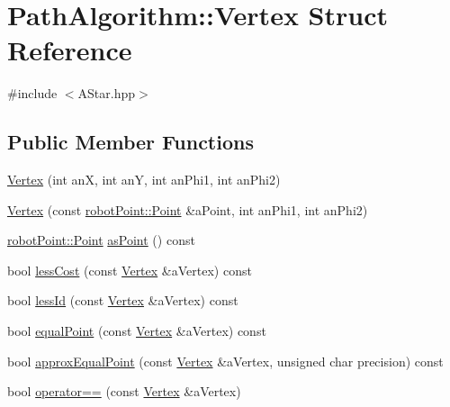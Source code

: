 \hypertarget{struct_path_algorithm_1_1_vertex}{}\section{Path\+Algorithm\+:\+:Vertex Struct Reference}
\label{struct_path_algorithm_1_1_vertex}


{\ttfamily \#include $<$A\+Star.\+hpp$>$}

\subsection*{Public Member Functions}
\begin{DoxyCompactItemize}
\item 
\hyperlink{struct_path_algorithm_1_1_vertex_af70ec098c542a181f2267be2db00b6c4}{Vertex} (int anX, int anY, int an\+Phi1, int an\+Phi2)
\item 
\hyperlink{struct_path_algorithm_1_1_vertex_ae480a024481aa5a9930822e69dd9a11d}{Vertex} (const \hyperlink{structrobot_point_1_1_point}{robot\+Point\+::\+Point} \&a\+Point, int an\+Phi1, int an\+Phi2)
\item 
\hyperlink{structrobot_point_1_1_point}{robot\+Point\+::\+Point} \hyperlink{struct_path_algorithm_1_1_vertex_a587c9c56b60eebbd200ee462656b4450}{as\+Point} () const 
\item 
bool \hyperlink{struct_path_algorithm_1_1_vertex_afe13add443706b4fb534fbc0af5b0bfc}{less\+Cost} (const \hyperlink{struct_path_algorithm_1_1_vertex}{Vertex} \&a\+Vertex) const 
\item 
bool \hyperlink{struct_path_algorithm_1_1_vertex_aea5063979800ccbd795fed9f33cbb483}{less\+Id} (const \hyperlink{struct_path_algorithm_1_1_vertex}{Vertex} \&a\+Vertex) const 
\item 
bool \hyperlink{struct_path_algorithm_1_1_vertex_a64aa2913bc0e1d1511a452c5d800803a}{equal\+Point} (const \hyperlink{struct_path_algorithm_1_1_vertex}{Vertex} \&a\+Vertex) const 
\item 
bool \hyperlink{struct_path_algorithm_1_1_vertex_a1548704fc5f1f4e829f419c2416667d9}{approx\+Equal\+Point} (const \hyperlink{struct_path_algorithm_1_1_vertex}{Vertex} \&a\+Vertex, unsigned char precision) const 
\item 
bool \hyperlink{struct_path_algorithm_1_1_vertex_a814d676297b497ea2a444e9f6fb0d6bf}{operator==} (const \hyperlink{struct_path_algorithm_1_1_vertex}{Vertex} \&a\+Vertex)
\end{DoxyCompactItemize}

